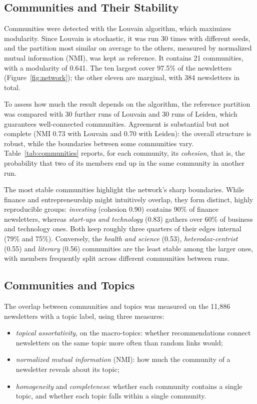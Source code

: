 \documentclass[sigchi]{acmart}
\begin{document}
\subsection{Communities and Their Stability}
Communities were detected with the Louvain algorithm, which maximizes
modularity. Since Louvain is stochastic, it was run 30 times with
different seeds, and the partition most similar on average to the
others, measured by normalized mutual information (NMI), was kept as
reference. It contains 21 communities, with a modularity of 0.641. The
ten largest cover 97.5\% of the newsletters (Figure~\ref{fig:network});
the other eleven are marginal, with 384 newsletters in total.

To assess how much the result depends on the algorithm, the reference
partition was compared with 30 further runs of Louvain and 30 runs of
Leiden, which guarantees well-connected communities. Agreement is
substantial but not complete (NMI 0.73 with Louvain and 0.70 with
Leiden): the overall structure is robust, while the boundaries between
some communities vary. Table~\ref{tab:communities} reports, for each
community, its \emph{cohesion}, that is, the probability that two of its members end up in the same community in another run. 

The most stable communities highlight the network's sharp boundaries. While finance and entrepreneurship might intuitively overlap, they form distinct, highly reproducible groups: \emph{investing} (cohesion 0.90) contains 90\% of finance newsletters, whereas \emph{start-ups and
technology} (0.83) gathers over 60\% of business and technology ones. Both keep roughly three quarters of their edges internal (79\% and
75\%). Conversely, the \emph{health and science} (0.53), \emph{heterodox-centrist } (0.55) and \emph{literary} (0.56) communities are the least stable among the larger ones, with members frequently split across different communities
between runs.

\subsection{Communities and Topics}
\label{sec:commtopics}

The overlap between communities and topics was measured on the
11{,}886 newsletters with a topic label, using three measures:
\begin{itemize}
  \item \emph{topical assortativity}, on the macro-topics: whether
  recommendations connect newsletters on the same topic more often than
  random links would;
  \item \emph{normalized mutual information} (NMI): how much the
  community of a newsletter reveals about its topic;
  \item \emph{homogeneity} and \emph{completeness}: whether each
  community contains a single topic, and whether each topic falls within
  a single community.
\end{itemize}
\end{document}
